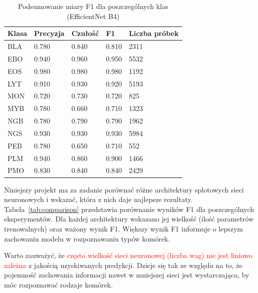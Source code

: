 \begin{table}
    \caption{Podsumowanie miary F1 dla poszczególnych klas (EfficientNet B4)}
    \begin{center}
        \begin{tabular}{|l|l|l|l|l|}
            \hline
            Klasa & Precyzja & Czułość & F1    & Liczba próbek \\
            \hline
            BLA   & 0.780    & 0.840   & 0.810 & 2311          \\
            \hline
            EBO   & 0.940    & 0.960   & 0.950 & 5532          \\
            \hline
            EOS   & 0.980    & 0.980   & 0.980 & 1192          \\
            \hline
            LYT   & 0.910    & 0.930   & 0.920 & 5193          \\
            \hline
            MON   & 0.720    & 0.730   & 0.720 & 825           \\
            \hline
            MYB   & 0.780    & 0.660   & 0.710 & 1323          \\
            \hline
            NGB   & 0.780    & 0.790   & 0.790 & 1962          \\
            \hline
            NGS   & 0.930    & 0.930   & 0.930 & 5984          \\
            \hline
            PEB   & 0.780    & 0.650   & 0.710 & 552           \\
            \hline
            PLM   & 0.940    & 0.860   & 0.900 & 1466          \\
            \hline
            PMO   & 0.830    & 0.840   & 0.840 & 2429          \\
            \hline
        \end{tabular}
    \end{center}
    \label{tab:f1_summary}
\end{table}

Niniejszy projekt ma za zadanie porównać różne architektury splotowych sieci neuronowych i wskazać, która z nich daje najlepsze rezultaty.
Tabela~\ref{tab:comparison} przedstawia porównanie wyników F1 dla poszczególnych eksperymentów.
Dla każdej architektury wskazano jej wielkość (ilość parametrów trenowalnych) oraz ważony wynik F1.
Większy wynik F1 informuje o lepszym zachowaniu modelu w rozpoznawaniu typów komórek.

Warto zauważyć, że \textcolor{red}{często wielkość sieci neuronowej (liczba wag)} \textcolor{red}{nie jest liniowo zależna} z jakością uzyskiwanych predykcji.
Dzieje się tak ze względu na to, że pojemność zachowania informacji nawet w mniejszej sieci jest wystarczająca, by móc rozpoznawać rodzaje komórek.

